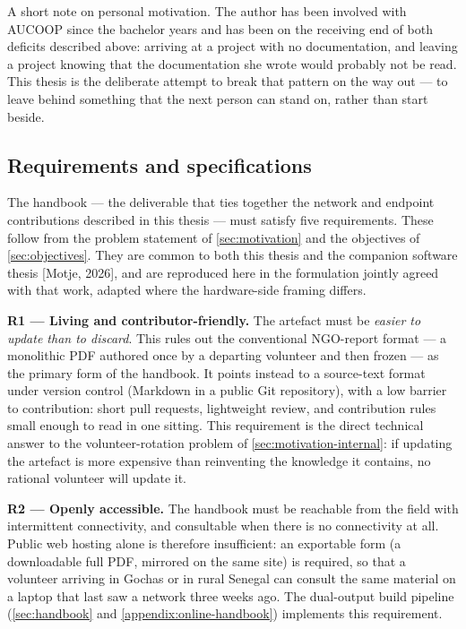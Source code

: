 A short note on personal motivation. The author has been involved with
AUCOOP since the bachelor years and has been on the receiving end of
both deficits described above: arriving at a project with no
documentation, and leaving a project knowing that the documentation she
wrote would probably not be read. This thesis is the deliberate attempt
to break that pattern on the way out --- to leave behind something that
the next person can stand on, rather than start beside.

\hypertarget{requirements-and-specifications}{%
\subsection{Requirements and
specifications}\label{requirements-and-specifications}}

The handbook --- the deliverable that ties together the network and
endpoint contributions described in this thesis --- must satisfy five
requirements. These follow from the problem statement of
\autoref{sec:motivation} and the objectives of \autoref{sec:objectives}.
They are common to both this thesis and the companion software thesis
{[}Motje, 2026{]}, and are reproduced here in the formulation jointly
agreed with that work, adapted where the hardware-side framing differs.

\textbf{R1 --- Living and contributor-friendly.} The artefact must be
\emph{easier to update than to discard}. This rules out the conventional
NGO-report format --- a monolithic PDF authored once by a departing
volunteer and then frozen --- as the primary form of the handbook. It
points instead to a source-text format under version control (Markdown
in a public Git repository), with a low barrier to contribution: short
pull requests, lightweight review, and contribution rules small enough
to read in one sitting. This requirement is the direct technical answer
to the volunteer-rotation problem of \autoref{sec:motivation-internal}:
if updating the artefact is more expensive than reinventing the
knowledge it contains, no rational volunteer will update it.

\textbf{R2 --- Openly accessible.} The handbook must be reachable from
the field with intermittent connectivity, and consultable when there is
no connectivity at all. Public web hosting alone is therefore
insufficient: an exportable form (a downloadable full PDF, mirrored on
the same site) is required, so that a volunteer arriving in Gochas or in
rural Senegal can consult the same material on a laptop that last saw a
network three weeks ago. The dual-output build pipeline
(\autoref{sec:handbook} and \autoref{appendix:online-handbook})
implements this requirement.

